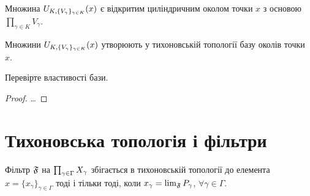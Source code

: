 \begin{remark}
    Множина $\CartesianNeighbourhood{x}$ є відкритим циліндричним околом точки $x$ з основою $\prod_{\gamma \in K} V_\gamma$.
\end{remark}

\begin{theorem}
    \label{th:tychonoff-topology-base}
    Множини $\CartesianNeighbourhood{x}$ утворюють у тихоновській топології базу околів точки~$x$.
\end{theorem}

\begin{exercise}
    Перевірте властивості бази.
\end{exercise}

\begin{proof}
    \dots
\end{proof}

\section{Тихоновська топологія і фільтри}

\begin{theorem}
    \label{th:tychonoff-topology-convergence-criterion}
    Фільтр $\frak F$ на $\CartesianProduct{X}$ збігається в тихоновській топології до елемента $x = \{x_\gamma\}_{\gamma \in \Gamma}$ тоді і тільки тоді, коли $x_\gamma = \lim_{\frak F} P_\gamma$, $\forall \gamma \in \Gamma$.
\end{theorem}

